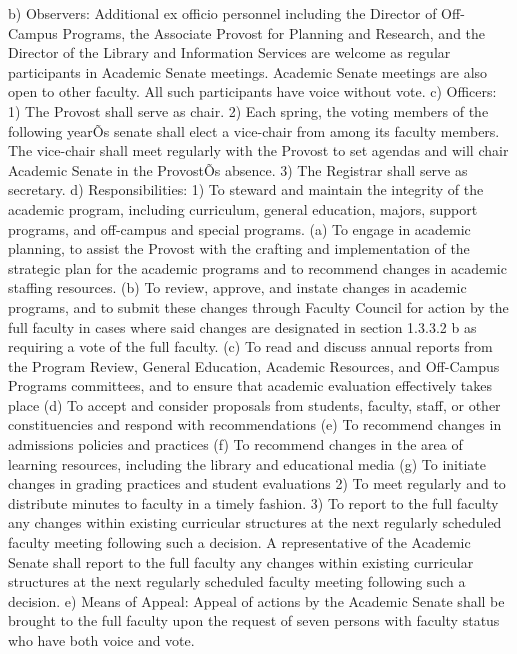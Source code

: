 \documentclass[letterpaper, 11pt]{article}
\begin{document}
				b) Observers:  Additional ex officio personnel including the Director of Off-Campus Programs, the Associate Provost for Planning and Research, and the Director of the Library and Information Services are welcome as regular participants in Academic Senate meetings.  Academic Senate meetings are also open to other faculty.  All such participants have voice without vote.
				c) Officers:
				1) The Provost shall serve as chair.
				2) Each spring, the voting members of the following yearÕs senate shall elect a vice-chair from among its faculty members.  The vice-chair shall meet regularly with the Provost to set agendas and will chair Academic Senate in the ProvostÕs absence.
				3) The Registrar shall serve as secretary.
				d) Responsibilities:
				1) To steward and maintain the integrity of the academic program, including curriculum, general education, majors, support programs, and off-campus and special programs.
				(a) To engage in academic planning, to assist the Provost with the crafting and implementation of the strategic plan for the academic programs and to recommend changes in academic staffing resources.
				(b) To review, approve, and instate changes in academic programs, and to submit these changes through Faculty Council for action by the full faculty in cases where said changes are designated in section 1.3.3.2 b as requiring a vote of the full faculty.
				(c) To read and discuss annual reports from the Program Review, General Education, Academic Resources, and Off-Campus Programs committees, and to ensure that academic evaluation effectively takes place
				(d) To accept and consider proposals from students, faculty, staff, or other constituencies and respond with recommendations
				(e) To recommend changes in admissions policies and practices
				(f) To recommend changes in the area of learning resources, including the library and educational media
				(g) To initiate changes in grading practices and student evaluations
				2) To meet regularly and to distribute minutes to faculty in a timely fashion.
				3) To report to the full faculty any changes within existing curricular structures at the next regularly scheduled faculty meeting following such a decision. A representative of the Academic Senate shall report to the full faculty any changes within existing curricular structures at the next regularly scheduled faculty meeting following such a decision.
				e) Means of Appeal:  Appeal of actions by the Academic Senate shall be brought to the full faculty upon the request of seven persons with faculty status who have both voice and vote.
\end{document}
